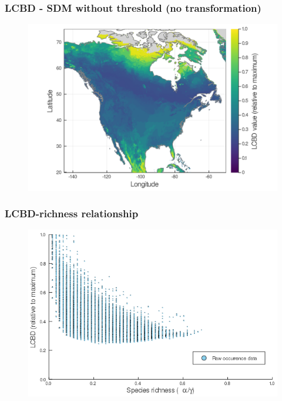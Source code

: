 \documentclass[10pt]{beamer}
\begin{document}
\begin{frame}
  \frametitle{LCBD - SDM without threshold (no transformation)}
  \begin{figure}
    \centering
    \hspace*{-0cm}\includegraphics[scale=0.17]{fig/05_sdm_lcbd.png}
  \end{figure}
\end{frame}

\begin{frame}
  \frametitle{LCBD-richness relationship}
  \begin{figure}
    \centering
    \includegraphics[scale=0.4]{fig/06_raw_relation.png}
  \end{figure}
\end{frame}
\end{document}
